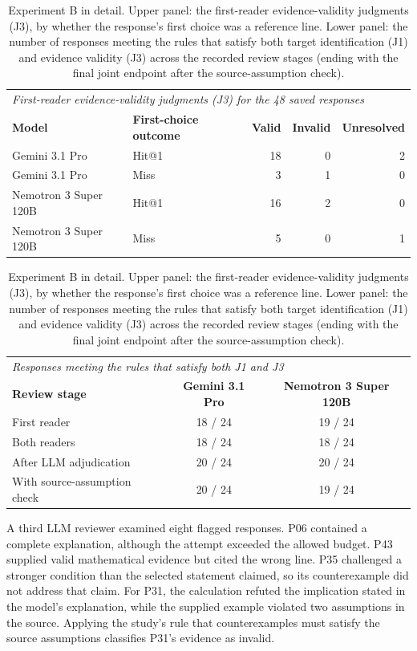 \begin{table}[h]
\centering\small
\begin{tabular}{l l r r r}
\toprule
\multicolumn{5}{l}{\emph{First-reader evidence-validity judgments (J3) for the 48 saved responses}}\\
\textbf{Model} & \textbf{First-choice outcome} & \textbf{Valid} & \textbf{Invalid} & \textbf{Unresolved} \\
\midrule
Gemini 3.1 Pro & Hit@1 & 18 & 0 & 2 \\
Gemini 3.1 Pro & Miss & 3 & 1 & 0 \\
Nemotron 3 Super 120B & Hit@1 & 16 & 2 & 0 \\
Nemotron 3 Super 120B & Miss & 5 & 0 & 1 \\
\bottomrule
\end{tabular}

\smallskip
\begin{tabular}{l c c}
\toprule
\multicolumn{3}{l}{\emph{Responses meeting the rules that satisfy both J1 and J3}}\\
\textbf{Review stage} & \textbf{Gemini 3.1 Pro} & \textbf{Nemotron 3 Super 120B} \\
\midrule
First reader & 18 / 24 & 19 / 24 \\
Both readers & 18 / 24 & 18 / 24 \\
After LLM adjudication & 20 / 24 & 20 / 24 \\
With source-assumption check & 20 / 24 & 19 / 24 \\
\bottomrule
\end{tabular}
\caption{Experiment B in detail. Upper panel: the first-reader evidence-validity judgments (J3), by whether the response's first choice was a reference line. Lower panel: the number of responses meeting the rules that satisfy both target identification (J1) and evidence validity (J3) across the recorded review stages (ending with the final joint endpoint after the source-assumption check).}
\label{tab:b-results-appendix}
\end{table}

A third LLM reviewer examined eight flagged responses. P06 contained a complete explanation, although the attempt exceeded the allowed budget. P43 supplied valid mathematical evidence but cited the wrong line. P35 challenged a stronger condition than the selected statement claimed, so its counterexample did not address that claim. For P31, the calculation refuted the implication stated in the model's explanation, while the supplied example violated two assumptions in the source. Applying the study's rule that counterexamples must satisfy the source assumptions classifies P31's evidence as invalid.

